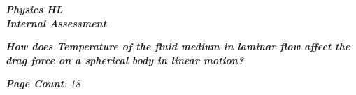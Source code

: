 

\begin{titlepage}
    \begin{center}
        \vspace*{1cm}
            
        \date{}
            
        \huge
            
        \textit{\textbf{Physics HL \\ Internal Assessment}}
            
        \vspace{0.25cm}
            
            
        \vspace{2.5cm}
            
            
            
        \vspace{2.5cm}
            
        \LARGE
            
        \textit{\textbf{How does Temperature of the fluid medium in laminar flow affect the drag force on a spherical body in linear motion? }}


		\vspace{1.5cm}
            
        \vspace{2.5cm}
            
        \Large
            
        \vspace{0.25cm}
        

		\vspace{1cm}            
            
		\Large		
		        
		\vspace{0.25cm} 
		


		\textit{\textbf{Page Count}: 18}
		   

\end{center}
\end{titlepage}
